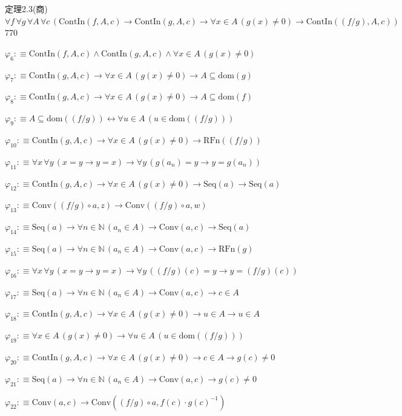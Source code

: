 \begin{fullproof}{定理2.3(商)}{$\forall f\,\forall g\,\forall A\,\forall c\,(\mathrm{ContIn}(f,A,c) \to \mathrm{ContIn}(g,A,c) \to \forall x \in A\,(g(x) \neq 0) \to \mathrm{ContIn}((f / g),A,c))$}{770}
\begin{abbrevlist}
\item $\varphi_{6} :\equiv \mathrm{ContIn}(f,A,c) \land \mathrm{ContIn}(g,A,c) \land \forall x \in A\,(g(x) \neq 0)$
\item $\varphi_{7} :\equiv \mathrm{ContIn}(g,A,c) \to \forall x \in A\,(g(x) \neq 0) \to A \subseteq \mathrm{dom}(g)$
\item $\varphi_{8} :\equiv \mathrm{ContIn}(g,A,c) \to \forall x \in A\,(g(x) \neq 0) \to A \subseteq \mathrm{dom}(f)$
\item $\varphi_{9} :\equiv A \subseteq \mathrm{dom}((f / g)) \leftrightarrow \forall u \in A\,(u \in \mathrm{dom}((f / g)))$
\item $\varphi_{10} :\equiv \mathrm{ContIn}(g,A,c) \to \forall x \in A\,(g(x) \neq 0) \to \mathrm{RFn}((f / g))$
\item $\varphi_{11} :\equiv \forall x\,\forall y\,(x = y \to y = x) \to \forall y\,(g(a_{n}) = y \to y = g(a_{n}))$
\item $\varphi_{12} :\equiv \mathrm{ContIn}(g,A,c) \to \forall x \in A\,(g(x) \neq 0) \to \mathrm{Seq}(a) \to \mathrm{Seq}(a)$
\item $\varphi_{13} :\equiv \mathrm{Conv}((f / g) \circ a,z) \to \mathrm{Conv}((f / g) \circ a,w)$
\item $\varphi_{14} :\equiv \mathrm{Seq}(a) \to \forall n \in \mathbb{N}\,(a_{n} \in A) \to \mathrm{Conv}(a,c) \to \mathrm{Seq}(a)$
\item $\varphi_{15} :\equiv \mathrm{Seq}(a) \to \forall n \in \mathbb{N}\,(a_{n} \in A) \to \mathrm{Conv}(a,c) \to \mathrm{RFn}(g)$
\item $\varphi_{16} :\equiv \forall x\,\forall y\,(x = y \to y = x) \to \forall y\,((f / g)(c) = y \to y = (f / g)(c))$
\item $\varphi_{17} :\equiv \mathrm{Seq}(a) \to \forall n \in \mathbb{N}\,(a_{n} \in A) \to \mathrm{Conv}(a,c) \to c \in A$
\item $\varphi_{18} :\equiv \mathrm{ContIn}(g,A,c) \to \forall x \in A\,(g(x) \neq 0) \to u \in A \to u \in A$
\item $\varphi_{19} :\equiv \forall x \in A\,(g(x) \neq 0) \to \forall u \in A\,(u \in \mathrm{dom}((f / g)))$
\item $\varphi_{20} :\equiv \mathrm{ContIn}(g,A,c) \to \forall x \in A\,(g(x) \neq 0) \to c \in A \to g(c) \neq 0$
\item $\varphi_{21} :\equiv \mathrm{Seq}(a) \to \forall n \in \mathbb{N}\,(a_{n} \in A) \to \mathrm{Conv}(a,c) \to g(c) \neq 0$
\item $\varphi_{22} :\equiv \mathrm{Conv}(a,c) \to \mathrm{Conv}((f / g) \circ a,f(c) \cdot g(c)^{-1})$

\end{abbrevlist}
\end{fullproof}
